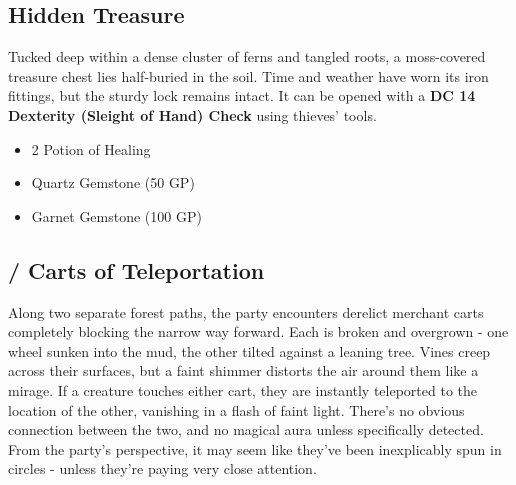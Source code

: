 \subsection*{ Hidden Treasure}
{\entryfont Tucked deep within a dense cluster of ferns and tangled roots, a moss-covered treasure chest lies half-buried in the soil. Time and weather have worn its iron fittings, but the sturdy lock remains intact. It can be opened with a \textbf{DC 14 Dexterity (Sleight of Hand) Check} using thieves' tools.
\begin{itemize}
	\item 2 Potion of Healing
	\item Quartz Gemstone (50 GP)
	\item Garnet Gemstone (100 GP)
\end{itemize}
}
\vfill\eject
\subsection*{/ Carts of Teleportation}
{\entryfont Along two separate forest paths, the party encounters derelict merchant carts completely blocking the narrow way forward. Each is broken and overgrown - one wheel sunken into the mud, the other tilted against a leaning tree. Vines creep across their surfaces, but a faint shimmer distorts the air around them like a mirage. If a creature touches either cart, they are instantly teleported to the location of the other, vanishing in a flash of faint light. There's no obvious connection between the two, and no magical aura unless specifically detected. From the party's perspective, it may seem like they've been inexplicably spun in circles - unless they're paying very close attention.}
